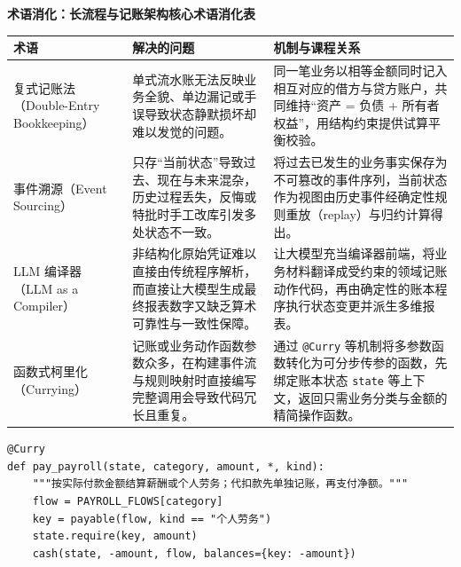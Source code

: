 \documentclass[UTF8,a4paper,11pt,fontset=fandol]{ctexart}
\begin{document}
\par{}\textbf{术语消化：长流程与记账架构核心术语消化表}

\begin{center}\small\begin{tabularx}{\linewidth}{YYY}

\toprule

术语 & 解决的问题 & 机制与课程关系\\\midrule

复式记账法（Double-Entry Bookkeeping） & 单式流水账无法反映业务全貌、单边漏记或手误导致状态静默损坏却难以发觉的问题。 & 同一笔业务以相等金额同时记入相互对应的借方与贷方账户，共同维持“资产 = 负债 + 所有者权益”，用结构约束提供试算平衡校验。\\[3pt]

事件溯源（Event Sourcing） & 只存“当前状态”导致过去、现在与未来混杂，历史过程丢失，反悔或特批时手工改库引发多处状态不一致。 & 将过去已发生的业务事实保存为不可篡改的事件序列，当前状态作为视图由历史事件经确定性规则重放（replay）与归约计算得出。\\[3pt]

LLM 编译器（LLM as a Compiler） & 非结构化原始凭证难以直接由传统程序解析，而直接让大模型生成最终报表数字又缺乏算术可靠性与一致性保障。 & 让大模型充当编译器前端，将业务材料翻译成受约束的领域记账动作代码，再由确定性的账本程序执行状态变更并派生多维报表。\\[3pt]

函数式柯里化（Currying） & 记账或业务动作函数参数众多，在构建事件流与规则映射时直接编写完整调用会导致代码冗长且重复。 & 通过 \texttt{@Curry} 等机制将多参数函数转化为可分步传参的函数，先绑定账本状态 \texttt{state} 等上下文，返回只需业务分类与金额的精简操作函数。\\[3pt]

\bottomrule\end{tabularx}\end{center}

\begin{lstlisting}[basicstyle={\ttfamily\small\linespread{1}\selectfont},captionpos=t,caption={受约束的薪酬与个人劳务结算动作片段（依赖项目内部接口）}]
@Curry
def pay_payroll(state, category, amount, *, kind):
    """按实际付款金额结算薪酬或个人劳务；代扣款先单独记账，再支付净额。"""
    flow = PAYROLL_FLOWS[category]
    key = payable(flow, kind == "个人劳务")
    state.require(key, amount)
    cash(state, -amount, flow, balances={key: -amount})
\end{lstlisting}
\end{document}
